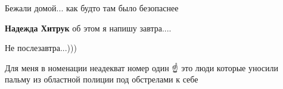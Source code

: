 
Бежали домой... как будто там было безопаснее

\begin{itemize} %
\textbf{Надежда Хитрук} об этом я напишу завтра....


Не послезавтра...)))

\end{itemize} %


Для меня в номенации неадекват номер один ☝️ это люди которые уносили пальму из
областной полиции под обстрелами к себе
